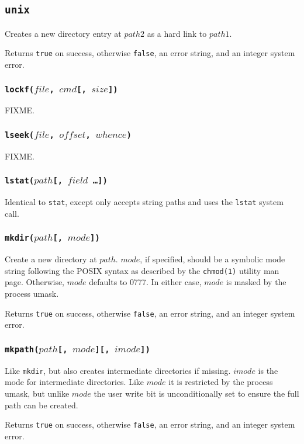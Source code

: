 \documentclass[11pt, oneside]{memoir}
\newcommand*{\true}[0]{\texttt{true}\xspace}
\newcommand*{\false}[0]{\texttt{false}\xspace}
\newcommand*{\syscall}[1]{\texttt{#1}\xspace}
\newcommand*{\fn}[1]{\texttt{#1}\xspace}
\newcounter{toccols}
\newenvironment{Module}[1]{
	\subsection{\texttt{#1}}
	\addtocontents{toc}{
		\protect\begin{multicols}{\value{toccols}}
	}
}{
	\addtocontents{toc}{\protect\end{multicols}}
}
\begin{document}
\begin{Module}{unix}
Creates a new directory entry at $path2$ as a hard link to $path1$.

Returns \true on success, otherwise \false, an error string, and an integer system error. 

\subsubsection[\fn{lockf}]{\fn{lockf($file$, $cmd$[, $size$])}}

FIXME.

\subsubsection[\fn{lseek}]{\fn{lseek($file$, $offset$, $whence$)}}

FIXME.

\subsubsection[\fn{lstat}]{\fn{lstat($path$[, $field$ \ldots])}}

Identical to \fn{stat}, except only accepts string paths and uses the \syscall{lstat} system call.

\subsubsection[\fn{mkdir}]{\fn{mkdir($path$[, $mode$])}}

Create a new directory at $path$. $mode$, if specified, should be a symbolic mode string following the POSIX syntax as described by the \texttt{chmod(1)} utility man page. Otherwise, $mode$ defaults to 0777. In either case, $mode$ is masked by the process umask.

Returns \true on success, otherwise \false, an error string, and an integer system error.

\subsubsection[\fn{mkpath}]{\fn{mkpath($path$[, $mode$][, $imode$])}}

Like \fn{mkdir}, but also creates intermediate directories if missing. $imode$ is the mode for intermediate directories. Like $mode$ it is restricted by the process umask, but unlike $mode$ the user write bit is unconditionally set to ensure the full path can be created.

Returns \true on success, otherwise \false, an error string, and an integer system error.


\end{Module}
\end{document}
